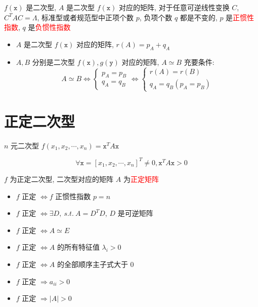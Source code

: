 \begin{theorem}[惯性定理]
	$f(\mathtt{x})$ 是二次型, $A$ 是二次型 $f(\mathtt{x})$ 对应的矩阵, 对于任意可逆线性变换 $C$, $C^{T}AC = \varLambda$,  
	标准型或者规范型中正项个数 $p$, 负项个数 $q$ 都是不变的, $p$ 是\textcolor{red}{正惯性指数}, $q$ 是\textcolor{red}{负惯性指数}
\end{theorem}

\begin{corollary}[惯性定理]
	\begin{itemize}
		\item $A$ 是二次型 $f(\mathtt{x})$ 对应的矩阵, $r(A) = p_{A} + q_{A}$
		\item $A,B$ 分别是二次型 $f(\mathtt{x}), g(\mathtt{y})$ 对应的矩阵, $A\simeq B$ 充要条件:
		$$A\simeq B \Leftrightarrow 
		\begin{cases}
			p_{A} = p_{B}\\
			q_{A} = q_{B}
		\end{cases} \Leftrightarrow
		\begin{cases}
		  	r(A) = r(B) \\
			q_{A} = q_{B} (p_{A} = p_{B})
		\end{cases}$$
	\end{itemize}
\end{corollary}

\section{正定二次型}

\begin{definition}[正定矩阵]
	$n$ 元二次型 $f(x_{1},x_{2},\cdots,x_{n}) = \mathtt{x}^{T}A\mathtt{x}$
	
	$$\forall \mathtt{x}=[x_{1},x_{2},\cdots,x_{n}]^{T}\neq 0, \mathtt{x}^{T}A\mathtt{x}>0$$
	
	$f$ 为正定二次型, 二次型对应的矩阵 $A$ 为\textcolor{red}{正定矩阵}
\end{definition}

\begin{corollary}[二次型正定充要条件]
	\begin{itemize}
		\item $f$ 正定 $\Leftrightarrow f$ 正惯性指数 $p = n$
		\item $f$ 正定 $\Leftrightarrow \exists D,\ s.t.\ A = D^{T}D$, $D$ 是可逆矩阵
		\item $f$ 正定 $\Leftrightarrow A\simeq E$
		\item $f$ 正定 $\Leftrightarrow A$ 的所有特征值 $\lambda_{i}>0$
		\item $f$ 正定 $\Leftrightarrow A$ 的全部顺序主子式大于 $0$
	\end{itemize}
\end{corollary}
\begin{corollary}[二次型正定必要条件]
	\begin{itemize}
		\item $f$ 正定 $\Rightarrow a_{ii}>0$
		\item $f$ 正定 $\Rightarrow |A|>0$
	\end{itemize}
\end{corollary}
